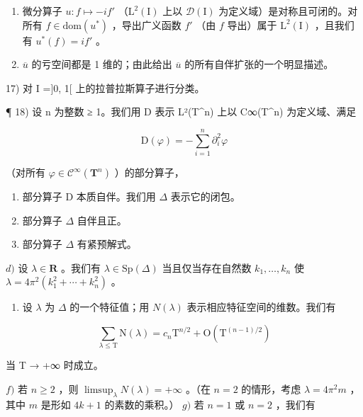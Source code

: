 \begin{enumerate}
\def\labelenumi{\alph{enumi})}
\setcounter{enumi}{1}
\item
  微分算子 \(u\colon f\mapsto -if'\) （\(\mathrm{L}^2 (\mathrm{I})\) 上以 \(\mathcal{D}(\mathrm{I})\) 为定义域）是对称且可闭的。对所有 \(f\in \mathrm{dom}(u^{*})\) ，导出广义函数 \(f'\) （由 \(f\) 导出）属于 \(\mathrm{L}^2 (\mathrm{I})\) ，且我们有 \(u^{*}(f) = if'\) 。
\item
  \(\overline{u}\) 的亏空间都是 1 维的；由此给出 \(\overline{u}\) 的所有自伴扩张的一个明显描述。
\end{enumerate}

17) 对 I ={]}0, 1{[} 上的拉普拉斯算子进行分类。

¶ 18) 设 n 为整数 ≥ 1。我们用 D 表示 L²(T\^{}n) 上以 C∞(T\^{}n) 为定义域、满足

\[
\mathrm{D} (\varphi) = - \sum_ {i = 1} ^ {n} \partial_ {i} ^ {2} \varphi
\]

（对所有 \(\varphi\in\mathcal{C}^{\infty}(\mathbf{T}^{n})\) ）的部分算子，

\begin{enumerate}
\def\labelenumi{\alph{enumi})}
\item
  部分算子 D 本质自伴。我们用 \(\Delta\) 表示它的闭包。
\item
  部分算子 \(\Delta\) 自伴且正。
\item
  部分算子 \(\Delta\) 有紧预解式。
\end{enumerate}

\(d)\) 设 \(\lambda\in\mathbf{R}\) 。我们有 \(\lambda\in\mathrm{Sp}(\Delta)\) 当且仅当存在自然数 \(k_{1},\ldots,k_{n}\) 使 \(\lambda=4\pi^{2}(k_{1}^{2}+\cdots+k_{n}^{2})\) 。

\begin{enumerate}
\def\labelenumi{\alph{enumi})}
\setcounter{enumi}{4}
\tightlist
\item
  设 \(\lambda\) 为 \(\Delta\) 的一个特征值；用 \(N(\lambda)\) 表示相应特征空间的维数。我们有
\end{enumerate}

\[
\sum_ {\lambda \leqslant \mathrm{T}} \mathrm{N} (\lambda) = c _ {n} \mathrm{T} ^ {n / 2} + \mathrm{O} (\mathrm{T} ^ {(n - 1) / 2})
\]

当 T → +∞ 时成立。

\(f)\) 若 \(n \geqslant 2\) ，则 \(\limsup_{\lambda} N(\lambda) = +\infty\) 。（在 \(n = 2\) 的情形，考虑 \(\lambda = 4\pi^2 m\) ，其中 \(m\) 是形如 \(4k + 1\) 的素数的乘积。） \(g)\) 若 \(n = 1\) 或 \(n = 2\) ，我们有

